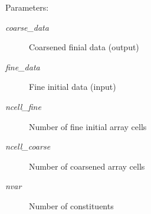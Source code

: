 \begin{Desc}
\item[Parameters:]
\begin{description}
\item[{\em coarse\_\-data}]Coarsened finial data (output)\item[{\em fine\_\-data}]Fine initial data (input)\item[{\em ncell\_\-fine}]Number of fine initial array cells\item[{\em ncell\_\-coarse}]Number of coarsened array cells \item[{\em nvar}]Number of constituents \end{description}
\end{Desc}
